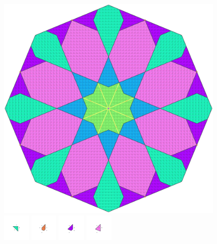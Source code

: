 \documentclass[text.tex]{subfiles}
\begin{document}
\clearpage
\pagestyle{fancy}
\fancyhf{}
\begin{figure}[h!]
\centering
\includegraphics[width=1\textwidth]{img/results/octagon/octagon_200000_(2_0alpha_1).pdf}
\includegraphics[width=0.12\textwidth]{img/results/octagon/octagon_200000_(2_0alpha_1)_001.pdf}
\includegraphics[width=0.12\textwidth]{img/results/octagon/octagon_200000_(2_0alpha_1)_002.pdf}
\includegraphics[width=0.12\textwidth]{img/results/octagon/octagon_200000_(2_0alpha_1)_003.pdf}
\includegraphics[width=0.12\textwidth]{img/results/octagon/octagon_200000_(2_0alpha_1)_004.pdf}

\end{figure}
\end{document}
